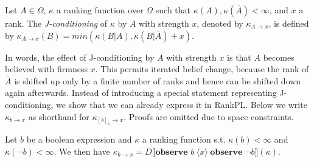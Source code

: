 \documentclass{llncs}
\newcommand{\mods}[2]{[#2]_{#1}}
\newcommand{\dn}[1]{D\llbracket #1 \rrbracket}
\newcommand{\Rank}[1]{\hspace{3pt} \pmb{\langle} #1 \pmb{\rangle}\hspace{3pt} } %
\begin{document}
\begin{definition}\label{defn:resultoriented}
Let $A \in \Omega$, $\kappa$ a ranking function over $\Omega$ such that $\kappa(A), \kappa(\overline A) < \infty$, and $x$ a rank.
The \emph{J-conditioning} of $\kappa$ by $A$ with strength $x$, denoted by $\kappa_{A \rightarrow x}$, is defined by
	$\kappa_{A \rightarrow x}(B) = min ( \kappa(B | A), \kappa(B | \overline A) + x ).$ %
\end{definition}

In words, the effect of J-conditioning by $A$ with strength $x$ is that $A$ becomes believed with firmness $x$.
This permits iterated belief change, because the rank of $\overline A$ is shifted up only by a finite number of ranks
	and hence can be shifted down again afterwards. %
Instead of introducing a special statement representing J-conditioning, we show that we can already express it in RankPL.
Below we write $\kappa_{b \rightarrow x}$ as shorthand for $\kappa_{\mods{\kappa}{b} \rightarrow x}$.
Proofs are omitted due to space constraints.

\begin{theorem}
Let $b$ be a boolean expression and $\kappa$ a ranking function s.t. $\kappa(b) < \infty$ and $\kappa(\neg b) < \infty$.
We then have
$\kappa_{b \rightarrow x} = \dn{\textbf{observe }b \Rank{x} \textbf{observe }\neg b}(\kappa).$ %
\end{theorem}
\end{document}
